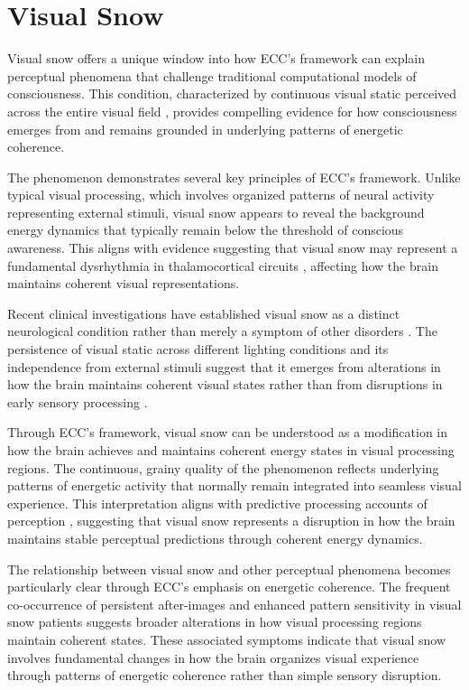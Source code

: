 \section{Visual Snow}

Visual snow offers a unique window into how ECC's framework can explain perceptual phenomena that challenge traditional computational models of consciousness. This condition, characterized by continuous visual static perceived across the entire visual field \cite{Puledda2020}, provides compelling evidence for how consciousness emerges from and remains grounded in underlying patterns of energetic coherence.

The phenomenon demonstrates several key principles of ECC's framework. Unlike typical visual processing, which involves organized patterns of neural activity representing external stimuli, visual snow appears to reveal the background energy dynamics that typically remain below the threshold of conscious awareness. This aligns with evidence suggesting that visual snow may represent a fundamental dysrhythmia in thalamocortical circuits \cite{Lauschke2016}, affecting how the brain maintains coherent visual representations.

Recent clinical investigations have established visual snow as a distinct neurological condition rather than merely a symptom of other disorders \cite{Schankin2014}. The persistence of visual static across different lighting conditions and its independence from external stimuli suggest that it emerges from alterations in how the brain maintains coherent visual states rather than from disruptions in early sensory processing \cite{Bessero2014}.

Through ECC's framework, visual snow can be understood as a modification in how the brain achieves and maintains coherent energy states in visual processing regions. The continuous, grainy quality of the phenomenon reflects underlying patterns of energetic activity that normally remain integrated into seamless visual experience. This interpretation aligns with predictive processing accounts of perception \cite{Clark2013}, suggesting that visual snow represents a disruption in how the brain maintains stable perceptual predictions through coherent energy dynamics.

The relationship between visual snow and other perceptual phenomena becomes particularly clear through ECC's emphasis on energetic coherence. The frequent co-occurrence of persistent after-images and enhanced pattern sensitivity in visual snow patients \cite{Puledda2020} suggests broader alterations in how visual processing regions maintain coherent states. These associated symptoms indicate that visual snow involves fundamental changes in how the brain organizes visual experience through patterns of energetic coherence rather than simple sensory disruption.

